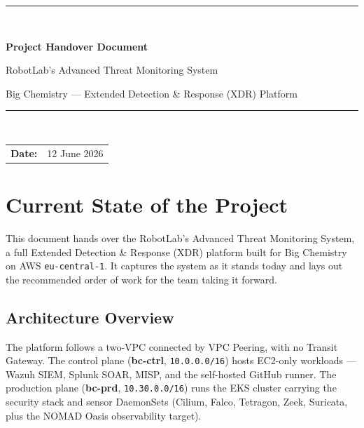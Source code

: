 \documentclass[11pt,a4paper]{report}
\begin{document}
\begin{titlepage}
    \centering
    \vspace*{2cm}

    {\color{accent}\rule{\textwidth}{2pt}}\\[0.6cm]
    {\Huge\bfseries\color{primary} Project Handover Document\par}
    \vspace{0.4cm}
    {\LARGE\color{primary} RobotLab's Advanced Threat Monitoring System \par}
    \vspace{0.2cm}
    {\large Big Chemistry — Extended Detection \& Response (XDR) Platform\par}
    {\color{accent}\rule{\textwidth}{2pt}}\\[1.5cm]

    \begin{tabular}{rl}    
        \textbf{Date:}          & 12 June 2026 \\[4pt]
    \end{tabular}

    \vfill
    
    \vspace{1cm}
\end{titlepage}

\tableofcontents
\thispagestyle{fancy}

\chapter{Current State of the Project}

This document hands over the RobotLab's Advanced Threat Monitoring System,
a full Extended Detection \& Response (XDR) platform built for Big Chemistry on
AWS \texttt{eu-central-1}. It captures the system as it stands today and lays out
the recommended order of work for the team taking it forward.

\section{Architecture Overview}

The platform follows a two-VPC connected by VPC Peering,
with no Transit Gateway. The control plane (\textbf{bc-ctrl}, \texttt{10.0.0.0/16})
hosts EC2-only workloads — Wazuh SIEM, Splunk SOAR, MISP, and the self-hosted
GitHub runner. The production plane (\textbf{bc-prd}, \texttt{10.30.0.0/16}) runs
the EKS cluster carrying the security stack and sensor DaemonSets (Cilium, Falco,
Tetragon, Zeek, Suricata, plus the NOMAD Oasis observability target).
\end{document}
